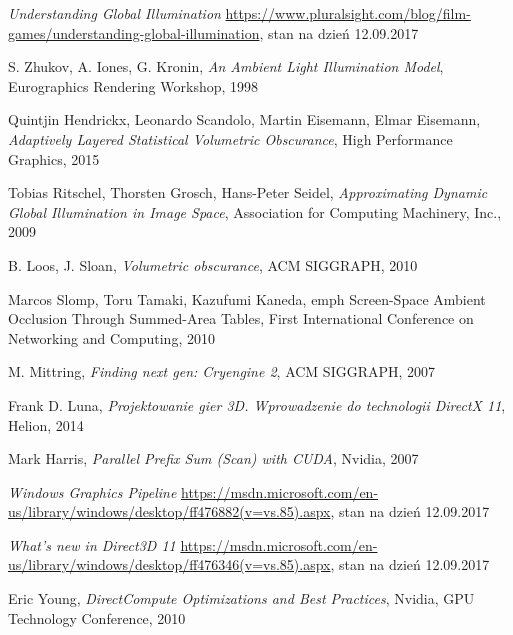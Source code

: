 \begin{thebibliography}{999}

 \emph{Understanding Global Illumination} \url{ https://www.pluralsight.com/blog/film-games/understanding-global-illumination}, stan na dzień 12.09.2017

 S. Zhukov, A. Iones, G. Kronin, \emph{An Ambient Light Illumination Model}, Eurographics Rendering Workshop, 1998

 Quintjin Hendrickx, Leonardo Scandolo, Martin Eisemann, Elmar Eisemann, \emph{Adaptively Layered Statistical Volumetric Obscurance}, High Performance Graphics, 2015

 Tobias Ritschel, Thorsten Grosch, Hans-Peter Seidel, \emph{Approximating Dynamic Global Illumination in Image Space}, Association for Computing Machinery, Inc., 2009

 B. Loos, J. Sloan, \emph{Volumetric obscurance}, ACM SIGGRAPH, 2010

 Marcos Slomp, Toru Tamaki, Kazufumi Kaneda, emph {Screen-Space Ambient Occlusion Through Summed-Area Tables}, First International Conference on Networking and Computing, 2010

 M. Mittring, \emph{Finding next gen: Cryengine 2}, ACM SIGGRAPH, 2007

 Frank D. Luna, \emph{Projektowanie gier 3D. Wprowadzenie do technologii DirectX 11}, Helion, 2014

 Mark Harris, \emph{Parallel Prefix Sum (Scan) with CUDA}, Nvidia, 2007

 \emph{Windows Graphics Pipeline} \url{https://msdn.microsoft.com/en-us/library/windows/desktop/ff476882(v=vs.85).aspx}, stan na dzień 12.09.2017

 \emph{What's new in Direct3D 11} \url{https://msdn.microsoft.com/en-us/library/windows/desktop/ff476346(v=vs.85).aspx}, stan na dzień 12.09.2017

 Eric Young, \emph{DirectCompute Optimizations and Best Practices}, Nvidia, GPU Technology Conference, 2010

\end{thebibliography}
